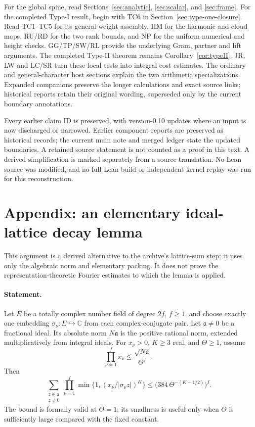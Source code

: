 \documentclass[11pt,a4paper]{article}
\numberwithin{equation}{section}
\theoremstyle{remark}\newtheorem{remark}[theorem]{Remark}
\begin{document}
For the global spine, read Sections~\ref{sec:analytic},
\ref{sec:scalar}, and \ref{sec:frame}. For the completed Type-I
result, begin with TC6 in Section~\ref{sec:type-one-closure}.
Read TC1--TC5 for its general-weight assembly, HM for the harmonic
and cloud maps, RU/RD for the two rank bounds, and NP for the
uniform numerical and height checks. GG/TP/SW/RL provide the
underlying Gram, partner and lift arguments.
The completed Type-II theorem remains Corollary~\ref{cor:typeII}.
JR, LW and LC/SR turn these local tests into integral cost estimates.
The ordinary and general-character host sections explain the two
arithmetic specializations. Expanded companions preserve the longer
calculations and exact source links; historical reports retain their
original wording, superseded only by the current boundary annotations.

Every earlier claim ID is preserved, with version-0.10 updates where an input is now discharged or narrowed. Earlier component reports are preserved as historical records; the current main note and merged ledger state the updated boundaries. A retained source statement is not counted as a proof in this text. A derived simplification is marked separately from a source translation. No Lean source was modified, and no full Lean build or independent kernel replay was run for this reconstruction.

\section{Appendix: an elementary ideal-lattice decay lemma}
\label{app:ag-lattice}

This argument is a derived alternative to the archive's
lattice-sum step; it uses only the algebraic norm and elementary
packing.  It does not prove the representation-theoretic Fourier
estimates to which the lemma is applied.

\paragraph{Statement.}
Let \(E\) be a totally complex number field of degree \(2f\),
\(f\ge1\), and choose exactly one embedding
\(\sigma_\nu:E\hookrightarrow\mathbb C\) from each complex-conjugate
pair.  Let \(\mathfrak a\ne0\) be a fractional ideal.  Its absolute
norm \(N\mathfrak a\) is the positive rational norm, extended
multiplicatively from integral ideals.  For \(x_\nu>0\), \(K\ge3\)
real, and \(\Theta\ge1\), assume
\[
 \prod_{\nu=1}^{f}x_\nu\le
        \frac{\sqrt{N\mathfrak a}}{\Theta^f}.
\]
Then
\[
 \sum_{\substack{z\in\mathfrak a\\z\ne0}}
 \prod_{\nu=1}^{f}
       \min\{1,(x_\nu/|\sigma_\nu z|)^K\}
 \le \bigl(384\,\Theta^{-(K-1/2)}\bigr)^f.                 \tag{AG.A1}
\]
The bound is formally valid at \(\Theta=1\); its smallness is
useful only when \(\Theta\) is sufficiently large compared with
the fixed constant.
\end{document}
